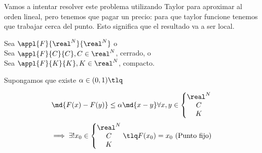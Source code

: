 \documentclass{apuntes}
\begin{document}
Vamos a intentar resolver este problema utilizando Taylor para aproximar al orden lineal, pero tenemos que pagar un precio: para que taylor funcione tenemos que trabajar cerca del punto. Esto significa que el resultado va a ser local.


\begin{theorem}
Sea $\appl{F}{\real^N}{\real^N}$ o\\
Sea $\appl{F}{C}{C}, C\in \real^N$, cerrado, o\\
Sea $\appl{F}{K}{K}, K\in \real^N$, compacto.

Supongamos que existe $\alpha\in(0,1) \tlq$

$$\md{F(x)-F(y)}\leq \alpha\md{x-y} \forall x,y \in \left\{\begin{matrix}
                                                           \real^N\\
                                                           C\\
                                                           K
                                                          \end{matrix}\right. 
                                              $$
$$\implies \exists ! x_0 \in\left\{\begin{matrix}         \real^N\\
                                                           C\\
                                                           K
                                                          \end{matrix}\right. 
                                                        \tlq F(x_0) = x_0 \text{ (Punto fijo)}$$
\end{theorem}
\end{document}
